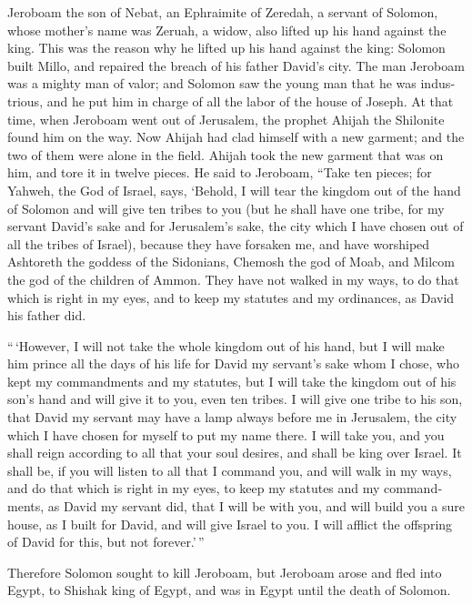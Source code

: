 \begin{paracol}{2}
\begin{otherlanguage}{english}
 Jeroboam the son of Nebat, an Ephraimite of Zeredah, a
servant of Solomon, whose mother's name was Zeruah, a widow, also lifted
up his hand against the king.  This was the reason why he
lifted up his hand against the king: Solomon built Millo, and repaired
the breach of his father David's city.  The man Jeroboam
was a mighty man of valor; and Solomon saw the young man that he was
industrious, and he put him in charge of all the labor of the house of
Joseph.  At that time, when Jeroboam went out of
Jerusalem, the prophet Ahijah the Shilonite found him on the way. Now
Ahijah had clad himself with a new garment; and the two of them were
alone in the field.  Ahijah took the new garment that was
on him, and tore it in twelve pieces.  He said to
Jeroboam, ``Take ten pieces; for Yahweh, the God of Israel, says,
`Behold, I will tear the kingdom out of the hand of Solomon and will
give ten tribes to you  (but he shall have one tribe, for
my servant David's sake and for Jerusalem's sake, the city which I have
chosen out of all the tribes of Israel),  because they
have forsaken me, and have worshiped Ashtoreth the goddess of the
Sidonians, Chemosh the god of Moab, and Milcom the god of the children
of Ammon. They have not walked in my ways, to do that which is right in
my eyes, and to keep my statutes and my ordinances, as David his father
did.

 ``\,`However, I will not take the whole kingdom out of
his hand, but I will make him prince all the days of his life for David
my servant's sake whom I chose, who kept my commandments and my
statutes,  but I will take the kingdom out of his son's
hand and will give it to you, even ten tribes.  I will
give one tribe to his son, that David my servant may have a lamp always
before me in Jerusalem, the city which I have chosen for myself to put
my name there.  I will take you, and you shall reign
according to all that your soul desires, and shall be king over Israel.
 It shall be, if you will listen to all that I command
you, and will walk in my ways, and do that which is right in my eyes, to
keep my statutes and my commandments, as David my servant did, that I
will be with you, and will build you a sure house, as I built for David,
and will give Israel to you.  I will afflict the
offspring of David for this, but not forever.'\,''

 Therefore Solomon sought to kill Jeroboam, but Jeroboam
arose and fled into Egypt, to Shishak king of Egypt, and was in Egypt
until the death of Solomon.


\end{otherlanguage}
\end{paracol}
